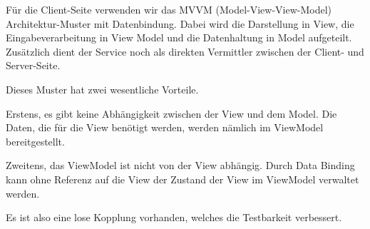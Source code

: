 Für die Client-Seite verwenden wir das MVVM (Model-View-View-Model) Architektur-Muster mit Datenbindung. 
Dabei wird die Darstellung in View, die Eingabeverarbeitung in View Model und die Datenhaltung in Model aufgeteilt. Zusätzlich dient der Service noch als direkten Vermittler zwischen der Client- und Server-Seite.

Dieses Muster hat zwei wesentliche Vorteile.

Erstens, es gibt keine Abhängigkeit zwischen der View und dem Model. Die Daten, die für die View benötigt werden, werden nämlich im ViewModel bereitgestellt.

Zweitens, das ViewModel ist nicht von der View abhängig. Durch Data Binding kann ohne Referenz auf die View der Zustand der View im ViewModel verwaltet werden. 

Es ist also eine lose Kopplung vorhanden, welches die Testbarkeit verbessert.
